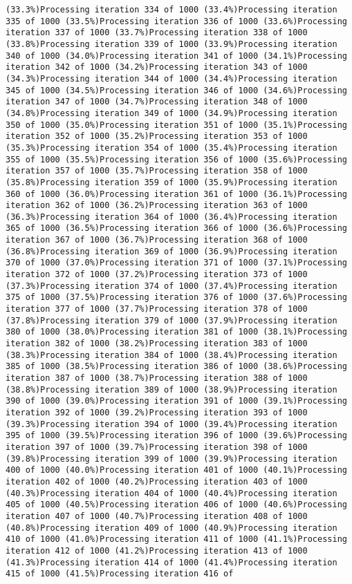 \documentclass[
]{article}
\begin{document}
\begin{verbatim}
(33.3%)Processing iteration 334 of 1000 (33.4%)Processing iteration 335 of 1000 (33.5%)Processing iteration 336 of 1000 (33.6%)Processing iteration 337 of 1000 (33.7%)Processing iteration 338 of 1000 (33.8%)Processing iteration 339 of 1000 (33.9%)Processing iteration 340 of 1000 (34.0%)Processing iteration 341 of 1000 (34.1%)Processing iteration 342 of 1000 (34.2%)Processing iteration 343 of 1000 (34.3%)Processing iteration 344 of 1000 (34.4%)Processing iteration 345 of 1000 (34.5%)Processing iteration 346 of 1000 (34.6%)Processing iteration 347 of 1000 (34.7%)Processing iteration 348 of 1000 (34.8%)Processing iteration 349 of 1000 (34.9%)Processing iteration 350 of 1000 (35.0%)Processing iteration 351 of 1000 (35.1%)Processing iteration 352 of 1000 (35.2%)Processing iteration 353 of 1000 (35.3%)Processing iteration 354 of 1000 (35.4%)Processing iteration 355 of 1000 (35.5%)Processing iteration 356 of 1000 (35.6%)Processing iteration 357 of 1000 (35.7%)Processing iteration 358 of 1000 (35.8%)Processing iteration 359 of 1000 (35.9%)Processing iteration 360 of 1000 (36.0%)Processing iteration 361 of 1000 (36.1%)Processing iteration 362 of 1000 (36.2%)Processing iteration 363 of 1000 (36.3%)Processing iteration 364 of 1000 (36.4%)Processing iteration 365 of 1000 (36.5%)Processing iteration 366 of 1000 (36.6%)Processing iteration 367 of 1000 (36.7%)Processing iteration 368 of 1000 (36.8%)Processing iteration 369 of 1000 (36.9%)Processing iteration 370 of 1000 (37.0%)Processing iteration 371 of 1000 (37.1%)Processing iteration 372 of 1000 (37.2%)Processing iteration 373 of 1000 (37.3%)Processing iteration 374 of 1000 (37.4%)Processing iteration 375 of 1000 (37.5%)Processing iteration 376 of 1000 (37.6%)Processing iteration 377 of 1000 (37.7%)Processing iteration 378 of 1000 (37.8%)Processing iteration 379 of 1000 (37.9%)Processing iteration 380 of 1000 (38.0%)Processing iteration 381 of 1000 (38.1%)Processing iteration 382 of 1000 (38.2%)Processing iteration 383 of 1000 (38.3%)Processing iteration 384 of 1000 (38.4%)Processing iteration 385 of 1000 (38.5%)Processing iteration 386 of 1000 (38.6%)Processing iteration 387 of 1000 (38.7%)Processing iteration 388 of 1000 (38.8%)Processing iteration 389 of 1000 (38.9%)Processing iteration 390 of 1000 (39.0%)Processing iteration 391 of 1000 (39.1%)Processing iteration 392 of 1000 (39.2%)Processing iteration 393 of 1000 (39.3%)Processing iteration 394 of 1000 (39.4%)Processing iteration 395 of 1000 (39.5%)Processing iteration 396 of 1000 (39.6%)Processing iteration 397 of 1000 (39.7%)Processing iteration 398 of 1000 (39.8%)Processing iteration 399 of 1000 (39.9%)Processing iteration 400 of 1000 (40.0%)Processing iteration 401 of 1000 (40.1%)Processing iteration 402 of 1000 (40.2%)Processing iteration 403 of 1000 (40.3%)Processing iteration 404 of 1000 (40.4%)Processing iteration 405 of 1000 (40.5%)Processing iteration 406 of 1000 (40.6%)Processing iteration 407 of 1000 (40.7%)Processing iteration 408 of 1000 (40.8%)Processing iteration 409 of 1000 (40.9%)Processing iteration 410 of 1000 (41.0%)Processing iteration 411 of 1000 (41.1%)Processing iteration 412 of 1000 (41.2%)Processing iteration 413 of 1000 (41.3%)Processing iteration 414 of 1000 (41.4%)Processing iteration 415 of 1000 (41.5%)Processing iteration 416 of 
\end{verbatim}
\end{document}
